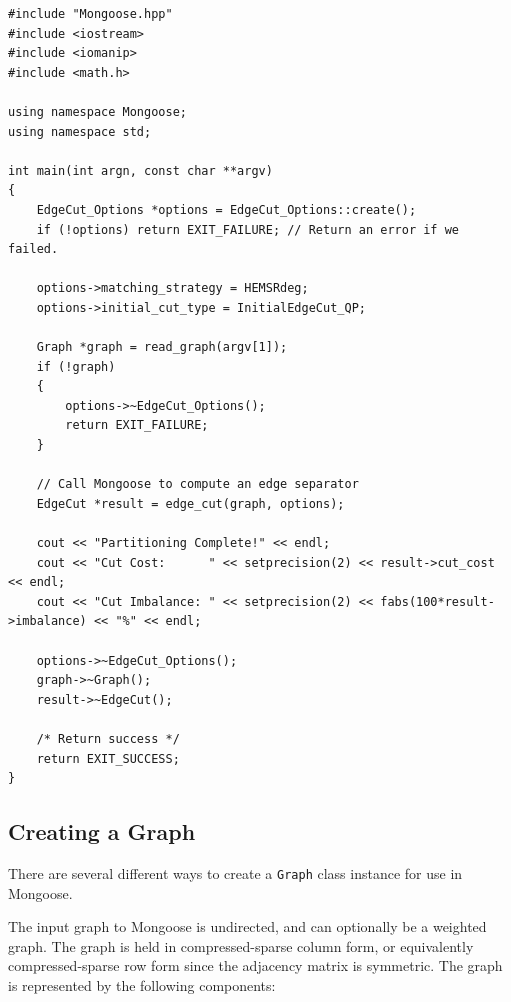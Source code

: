 \documentclass[letter]{article}
\begin{document}
\begin{lstlisting}
#include "Mongoose.hpp"
#include <iostream>
#include <iomanip>
#include <math.h>

using namespace Mongoose;
using namespace std;

int main(int argn, const char **argv)
{
    EdgeCut_Options *options = EdgeCut_Options::create();
    if (!options) return EXIT_FAILURE; // Return an error if we failed.

    options->matching_strategy = HEMSRdeg;
    options->initial_cut_type = InitialEdgeCut_QP;

    Graph *graph = read_graph(argv[1]);
    if (!graph)
    {
        options->~EdgeCut_Options();
        return EXIT_FAILURE;
    }

    // Call Mongoose to compute an edge separator
    EdgeCut *result = edge_cut(graph, options);

    cout << "Partitioning Complete!" << endl;
    cout << "Cut Cost:      " << setprecision(2) << result->cut_cost << endl;
    cout << "Cut Imbalance: " << setprecision(2) << fabs(100*result->imbalance) << "%" << endl;

    options->~EdgeCut_Options();
    graph->~Graph();
    result->~EdgeCut();

    /* Return success */
    return EXIT_SUCCESS;
}
\end{lstlisting}

\subsection{Creating a Graph}

There are several different ways to create a \texttt{Graph} class instance for use in Mongoose.

The input graph to Mongoose is undirected, and can optionally be a weighted
graph.  The graph is held in compressed-sparse column form, or equivalently
compressed-sparse row form since the adjacency matrix is symmetric.  The graph
is represented by the following components:
\end{document}
